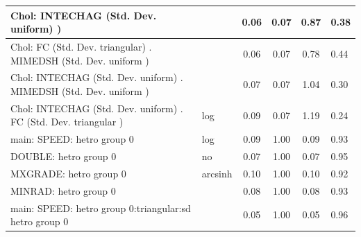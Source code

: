 \begin{table}
\begin{center}
\begin{tabular}{|l|l|c|c|c|l|}
			\hline
			 Chol: INTECHAG (Std. Dev. uniform) ) &  & 0.06 & 0.07 & 0.87 & 0.38 \\
			\hline
			 Chol: FC (Std. Dev. triangular) . MIMEDSH (Std. Dev.   uniform ) &  & 0.06 & 0.07 & 0.78 & 0.44 \\
			\hline
			 Chol: INTECHAG (Std. Dev. uniform) . MIMEDSH (Std. Dev.   uniform ) &  & 0.07 & 0.07 & 1.04 & 0.30 \\
			\hline
			 Chol: INTECHAG (Std. Dev. uniform) . FC (Std. Dev.   triangular ) & log & 0.09 & 0.07 & 1.19 & 0.24 \\
			\hline
			main: SPEED: hetro group 0 & log & 0.09 & 1.00 & 0.09 & 0.93 \\
			\hline
			DOUBLE: hetro group 0 & no & 0.07 & 1.00 & 0.07 & 0.95 \\
			\hline
			MXGRADE: hetro group 0 & arcsinh & 0.10 & 1.00 & 0.10 & 0.92 \\
			\hline
			MINRAD: hetro group 0 &  & 0.08 & 1.00 & 0.08 & 0.93 \\
			\hline
			main: SPEED: hetro group 0:triangular:sd  hetro group 0 &  & 0.05 & 1.00 & 0.05 & 0.96 \\
			\hline
		\end{tabular}
	\end{center}
\end{table}